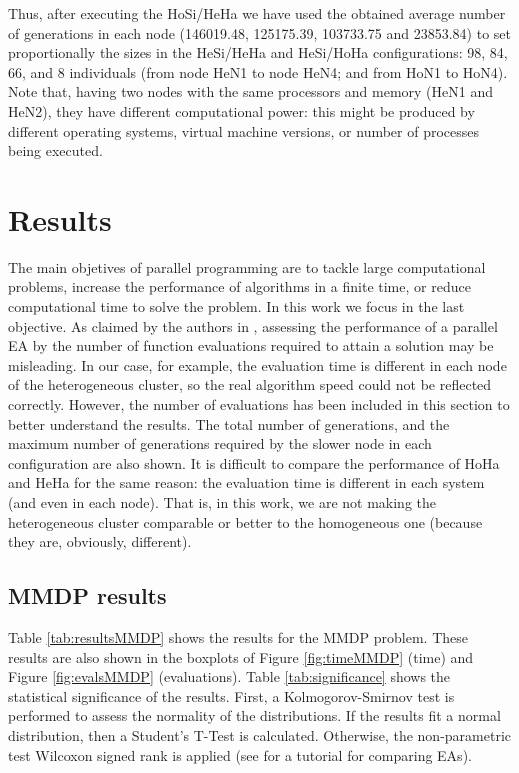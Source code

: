 \documentclass[final,1p,times]{elsarticle}
\begin{document}
Thus, after executing the HoSi/HeHa we have used the obtained average number of generations in each node (146019.48, 125175.39, 103733.75 and 23853.84) to set proportionally the sizes in the HeSi/HeHa and HeSi/HoHa configurations: 98, 84, 66, and 8 individuals (from node HeN1 to node HeN4; and from HoN1 to HoN4). Note that, having two nodes with the same processors and memory (HeN1 and HeN2), they have different computational power: this might be produced by different operating systems, virtual machine versions, or number of processes being executed.






\section{Results}
\label{sec:results}

The main objetives of parallel programming are to tackle large computational problems, increase the performance of algorithms in a finite time, or reduce computational time to solve the problem. In this work we focus in the last objective.
As claimed by the authors in \cite{EVALUATIONPARALLEL}, assessing the performance of a parallel EA by the number of function evaluations required to attain a solution may be misleading. In our case, for example, the evaluation time is different in each node of the heterogeneous cluster, so the real algorithm speed could not be reflected correctly. However, the number of evaluations has been included in this section to better understand the results. The total number of generations, and the maximum number of generations required by the slower node in each configuration are also shown. It is difficult to compare the performance of HoHa and HeHa for the same reason: the evaluation time is different in each system (and even in each node). That is, in this work, we are not making the heterogeneous cluster comparable or better to the homogeneous one (because they are, obviously, different).

\subsection{MMDP results}

Table \ref{tab:resultsMMDP} shows the results for the MMDP problem. These results are also shown in the boxplots of Figure \ref{fig:timeMMDP} (time) and Figure \ref{fig:evalsMMDP} (evaluations). Table \ref{tab:significance} shows the statistical significance of the results. First, a Kolmogorov-Smirnov test is performed to assess the normality of the distributions. If the results fit a normal distribution, then a Student's T-Test is calculated. Otherwise, the non-parametric test Wilcoxon signed rank is applied (see \cite{TUTORIAL} for a tutorial for comparing EAs).
\end{document}

